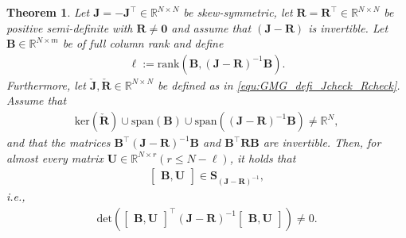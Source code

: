 \documentclass{article}
\newtheorem{theorem}{Theorem}[section]
\newcommand{\bmU}{\bm{U}}
\newcommand{\bmJ}{\bm{J}}
\newcommand{\bmR}{\bm{R}}
\newcommand{\bmB}{\bm{B}}
\newcommand{\R}{\mathbb{R}}
\newcommand{\portsize}{m}
\newcommand{\FOMsize}{N}
\newcommand{\ROMsize}{r}
\newcommand{\matset}{\mathbf{S}}
\newcommand{\Jcheck}{\check{\bmJ}}
\newcommand{\Rcheck}{\check{\bmR}}
\begin{document}
\begin{theorem}
\label{Theo:exists_JR_inv_BVbar}
Let $\bmJ=-\bmJ^{\top}\in\R^{\FOMsize\times \FOMsize}$ be skew-symmetric, let $\bmR=\bmR^{\top} \in\R^{\FOMsize\times\FOMsize}$ be positive semi-definite with $\bmR \neq \bm{0}$ and assume that $(\bmJ-\bmR)$ is invertible. Let $\bmB\in\R^{\FOMsize\times\portsize}$ be of full column rank and define 
\begin{align*}
	\ell := \mathrm{rank}\left(\bmB, (\bmJ-\bmR)^{-1}\bmB \right).
\end{align*}
Furthermore, let $\Jcheck,\Rcheck \in \R^{\FOMsize \times \FOMsize}$ be defined as in \eqref{equ:GMG_defi_Jcheck_Rcheck}. Assume that 
\begin{align} \label{eq:full_space_assumption}
			 \mathrm{ker}(\Rcheck)\cup
			 \mathrm{span}(\bmB)\cup
			 \mathrm{span}((\bmJ-\bmR)^{-1}\bmB)
			 \neq
			 \R^{\FOMsize},
\end{align}			 
and that the matrices $\bmB^{\top}(\bmJ-\bmR)^{-1}\bmB$ and $\bmB^{\top}\bmR\bmB$ are invertible. Then, for almost every matrix $\bmU\in \R^{\FOMsize\times\ROMsize} (\ROMsize\leq\FOMsize-\ell)$, it holds that 
\begin{align*}
	\begin{bmatrix}
				\bmB,\bmU
			\end{bmatrix}\in\matset_{(\bmJ-\bmR)^{-1}},
\end{align*}
i.e., 
\begin{align*}
\mathrm{det}\left(\begin{bmatrix}
				\bmB,\bmU
			\end{bmatrix}^{\top}(\bmJ-\bmR)^{-1}\begin{bmatrix}
				\bmB,\bmU
			\end{bmatrix}\right)\neq 0.
\end{align*}
\end{theorem}
\end{document}
